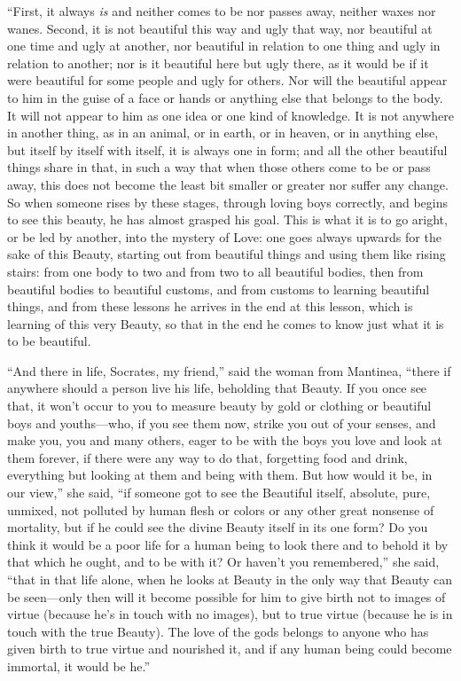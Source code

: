 “First, it always {\em is} and neither comes to be nor passes away,
neither waxes nor wanes. Second, it is not beautiful this way and ugly
that way, nor beautiful at one time and ugly at another, nor beautiful
in relation to one thing and ugly in relation to another; nor is it
beautiful here but ugly there, as it would be if it were beautiful for
some people and ugly for others. Nor will the beautiful appear to him in
the guise of a face or hands or anything else that belongs to the body.
It will not appear to him as one idea or one kind of knowledge. It is
not anywhere in another thing, as in  an animal, or in earth, or
in heaven, or in anything else, but itself by itself with itself, it is
always one in form; and all the other beautiful things share in that, in
such a way that when those others come to be or pass away, this does not
become the least bit smaller or greater nor suffer any change. So when
someone rises by these stages, through loving boys correctly, and begins
to see this beauty, he has almost grasped his goal. This is what it
 is to go aright, or be led by another, into the mystery of Love:
one goes always upwards for the sake of this Beauty, starting out from
beautiful things and using them like rising stairs: from one body to two
and from two to all beautiful bodies, then from beautiful bodies to
beautiful customs, and from customs to learning beautiful things, and
from these lessons he
arrives in the end at
this lesson, which is learning of this very Beauty, so that in the end
he comes to know just what it is to be beautiful. 

“And there in life, Socrates, my friend,” said the woman from Mantinea,
“there if anywhere should a person live his life, beholding that Beauty.
If you once see that, it won't occur to you to measure beauty by gold or
clothing or beautiful boys and youths---who, if you see them now, strike
you out of your senses, and make you, you and many others, eager to be
with the boys you love and look at them forever, if there were any way
to do that, forgetting food and drink, everything but looking at them
and  being with them. But how would it be, in our view,” she
said, “if someone got to see the Beautiful itself, absolute, pure,
unmixed, not polluted by human flesh or colors or any other great
nonsense of mortality, but if he  could see the divine
Beauty itself in its one form? Do you think it would be a poor life for
a human being to look there and to behold it by that which he ought, and
to be with it? Or haven't you remembered,” she said, “that in that life
alone, when he looks at Beauty in the only way that Beauty can be
seen---only then will it become possible for him to give birth not to
images of virtue (because he's in touch with no images), but to true
virtue (because he is in touch with the true Beauty). The love of the
gods belongs to anyone who has given birth to true virtue and nourished
it,  and if any human being could become immortal, it would be
he.”

